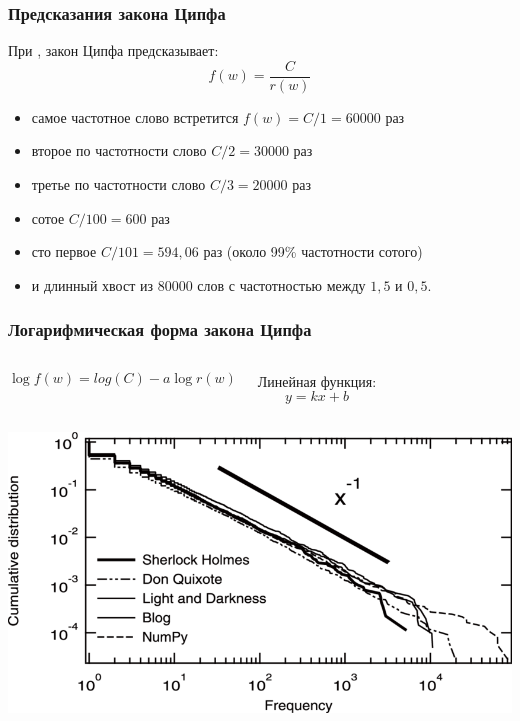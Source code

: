 \documentclass[svgnames]{beamer}
\begin{document}
\begin{frame}
  \frametitle{Предсказания закона Ципфа}
  При ,  закон Ципфа предсказывает:
  $$
       f(w) = \frac{C}{r(w)}
  $$
 \begin{itemize}
  \item самое частотное слово встретится $f(w)=C/1=60000$ раз
  \item второе по частотности слово $C/2=30000$ раз
  \item третье по частотности слово $C/3=20000$ раз
  \item сотое $C/100=600$ раз
  \item сто первое $C/101=594,06$ раз (около 99\% частотности сотого)
  \item и длинный хвост из 80000 слов с частотностью между $1,5$ и $0,5$.
  \end{itemize}
\end{frame}

\begin{frame}
  \frametitle{Логарифмическая форма закона Ципфа}

  \begin{columns}
    \begin{equation}
      \log f(w) = log(C) - a\log r(w)
    \end{equation}

    \begin{block}{Линейная функция:}
    $$
    y = kx + b
    $$
  \end{block}
\end{columns}
\end{frame}

\begin{frame}[plain]
  \includegraphics[width=\textwidth]{zipf-log-ex}
\end{frame}
\end{document}
